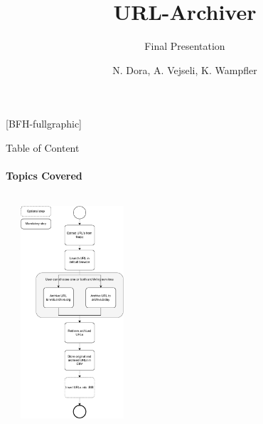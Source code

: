 \documentclass[
    ngerman,%
    authorontitle=true,
]{bfhbeamer}
\title{URL-Archiver}
\subtitle{Final Presentation}
\author[N. Dora \and A. Vejseli \and K. Wampfler]{N. Dora, A. Vejseli, K. Wampfler}
\institute{School of Engineering and Computer Science}
\begin{document}
    [BFH-fullgraphic]
    \maketitle



    \begin{frame}{Table of Content}
        \framesubtitle{Topics Covered}
        \begin{columns} %
            \begin{column}{0.4\textwidth} %
                \tableofcontents
            \end{column}
            \begin{column}{0.6\textwidth} %
                \begin{center}
                    \includegraphics[width=0.3\textwidth]{figures/process_model-simple-vertikal}
                \end{center}
            \end{column}
        \end{columns}
    \end{frame}
\end{document}
